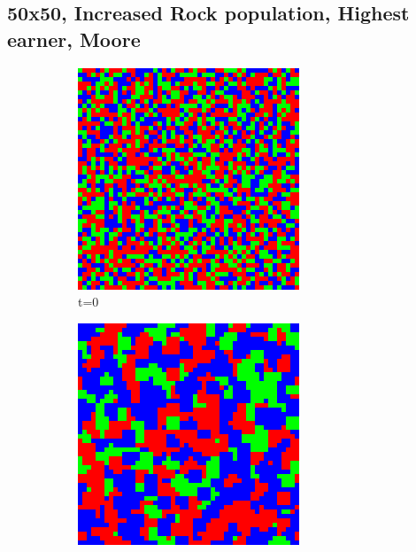 \documentclass[a4paper, 11pt]{article}
\begin{document}
\newpage
\begin{landscape}
\subsection{50x50, Increased Rock population, Highest earner, Moore}

\begin{figure}[H]
\centering
\begin{subfigure}{.20\textwidth}
  \centering
  \includegraphics[width=0.95\linewidth]{ROCK_PAPER_SCISSORS_MOORE_50x50_HighRockPop_t00}
  \caption{t=0}
\end{subfigure}%
\begin{subfigure}{.20\textwidth}
  \centering
  \includegraphics[width=0.95\linewidth]{ROCK_PAPER_SCISSORS_MOORE_50x50_HighRockPop_t01}

\end{subfigure}
\end{figure}
\end{landscape}
\end{document}
